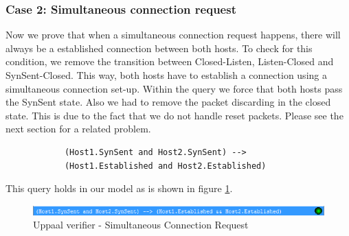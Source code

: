 \documentclass[twocolumn]{article}
\begin{document}
		\subsubsection{Case 2: Simultaneous connection request}
		Now we prove that when a simultaneous connection request happens, there will always be a established connection between both hosts. To check for this condition, we remove the transition between Closed-Listen, Listen-Closed and SynSent-Closed. This way, both hosts have to establish a connection using a simultaneous connection set-up. Within the query we force that both hosts pass the SynSent state. Also we had to remove the packet discarding in the closed state. This is due to the fact that we do not handle reset packets. Please see the next section for a related problem.
		\begin{verbatim}
			(Host1.SynSent and Host2.SynSent) -->
			(Host1.Established and Host2.Established)
		\end{verbatim}
		This query holds in our model as is shown in figure \ref{fig:verifier3}.
		\begin{figure}[h!]
			\begin{center}
				\includegraphics[width=\linewidth]{verifier-simul.png}
			\end{center}
			\caption{Uppaal verifier - Simultaneous Connection Request}
			\label{fig:verifier3}
		\end{figure}
		
\end{document}
